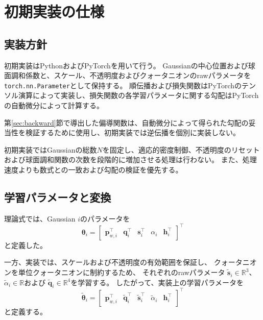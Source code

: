 \documentclass[dvipdfmx]{jlreq}
\begin{document}
\section{初期実装の仕様}
\label{sec:implementation_details}

\subsection{実装方針}
初期実装はPythonおよびPyTorchを用いて行う。
Gaussianの中心位置および球面調和係数と、スケール、不透明度およびクォータニオンのrawパラメータを\texttt{torch.nn.Parameter}として保持する。
順伝播および損失関数はPyTorchのテンソル演算によって実装し、損失関数の各学習パラメータに関する勾配はPyTorchの自動微分によって計算する。

第\ref{sec:backward}節で導出した偏導関数は、自動微分によって得られた勾配の妥当性を検証するために使用し、初期実装では逆伝播を個別に実装しない。

初期実装ではGaussianの総数$N$を固定し、適応的密度制御、不透明度のリセットおよび球面調和関数の次数を段階的に増加させる処理は行わない。
また、処理速度よりも数式との一致および勾配の検証を優先する。

\subsection{学習パラメータと変換}
\label{sec:parameter_transformation}
理論式では、Gaussian $i$のパラメータを
\begin{equation}
    \bm{\theta}_i = \begin{bmatrix} \bm{p}_{w,i}^{\top} & \bm{q}_i^{\top} & \bm{s}_i^{\top} & \alpha_i & \bm{h}_i^{\top} \end{bmatrix}^{\top}
\end{equation}
と定義した。

一方、実装では、スケールおよび不透明度の有効範囲を保証し、
クォータニオンを単位クォータニオンに制約するため、
それぞれのrawパラメータ
$\widetilde{\bm{s}}_i\in\mathbb{R}^3$、
$\widetilde{\alpha}_i\in\mathbb{R}$および
$\widetilde{\bm{q}}_i\in\mathbb{R}^4$を学習する。
したがって、実装上の学習パラメータを
\begin{equation}
    \widetilde{\bm{\theta}}_i = \begin{bmatrix} \bm{p}_{w,i}^{\top} & \widetilde{\bm{q}}_i^{\top} & \widetilde{\bm{s}}_i^{\top} & \widetilde{\alpha}_i & \bm{h}_i^{\top} \end{bmatrix}^{\top}
    \label{eq:raw_gaussian_parameters}
\end{equation}
と定義する。
\end{document}

